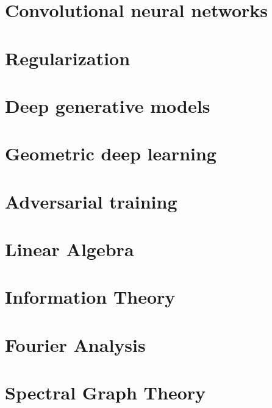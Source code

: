 \chapter{Convolutional neural networks} 


\chapter{Regularization} 


\chapter{Deep generative models} 


\chapter{Geometric deep learning} 


\chapter{Adversarial training} 


% 

\appendix

\chapter{Linear Algebra} 

\chapter{Information Theory} \label{sec:appendix-A}

\chapter{Fourier Analysis} \label{sec:appendix:fourier}

\chapter{Spectral Graph Theory} 

